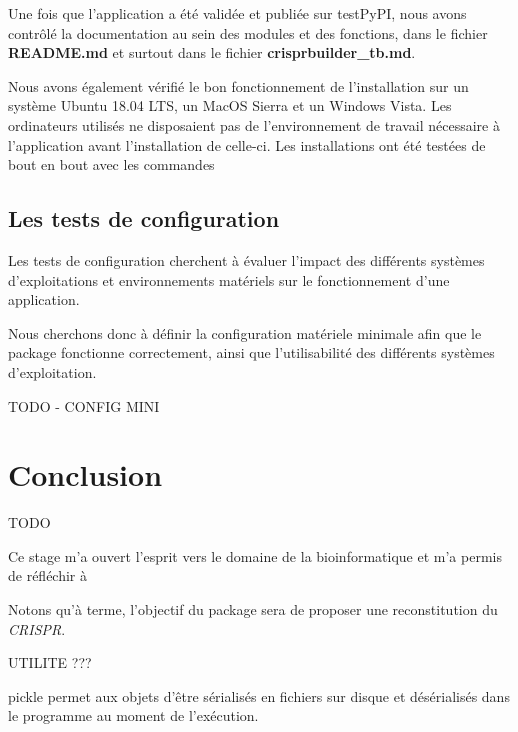 \documentclass[twoside,a4paper,11pt,frenchb,openany]{report}
\begin{document}
Une fois que l'application a été validée et publiée sur testPyPI, nous avons contrôlé la documentation au sein des modules et des fonctions, dans le fichier \textbf{README.md} et surtout dans le fichier \textbf{crisprbuilder\_tb.md}. 

Nous avons également vérifié le bon fonctionnement de l'installation sur un système Ubuntu 18.04 LTS, un MacOS Sierra et un Windows Vista. Les ordinateurs utilisés ne disposaient pas de l'environnement de travail nécessaire à l'application avant l'installation de celle-ci. Les installations ont été testées de bout en bout avec les commandes


\section{Les tests de configuration}

Les tests de configuration cherchent à évaluer l'impact des différents systèmes d'exploitations et environnements matériels sur le fonctionnement d'une application.

Nous cherchons donc à définir la configuration matériele minimale afin que le package fonctionne correctement, ainsi que l'utilisabilité des différents systèmes d'exploitation.

TODO - CONFIG MINI






\chapter*{Conclusion}

TODO

Ce stage m'a ouvert l'esprit vers le domaine de la bioinformatique et m'a permis de réfléchir à 

Notons qu'à terme, l'objectif du package sera de proposer une reconstitution du \textit{CRISPR}.
	




	



UTILITE ???

pickle permet aux objets d'être sérialisés en fichiers sur disque et désérialisés dans le programme au moment de l'exécution.
	
\end{document}
